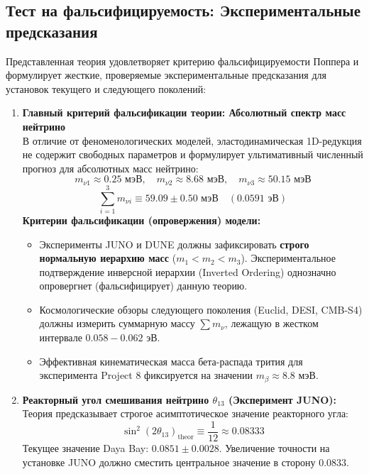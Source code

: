 \documentclass[12pt,a4paper]{article}
\begin{document}
\subsection{Тест на фальсифицируемость: Экспериментальные предсказания}
Представленная теория удовлетворяет критерию фальсифицируемости Поппера и формулирует жесткие, проверяемые экспериментальные предсказания для установок текущего и следующего поколений:

\begin{enumerate}
	\item \textbf{Главный критерий фальсификации теории: Абсолютный спектр масс нейтрино} \\
	В отличие от феноменологических моделей, эластодинамическая 1D-редукция не содержит свободных параметров и формулирует ультимативный численный прогноз для абсолютных масс нейтрино:
	\begin{equation}
		m_{\nu 1} \approx \mathbf{0.25 \text{ мэВ}}, \quad m_{\nu 2} \approx \mathbf{8.68 \text{ мэВ}}, \quad m_{\nu 3} \approx \mathbf{50.15 \text{ мэВ}}
	\end{equation}
	\begin{equation}
		\sum_{i=1}^3 m_{\nu i} \equiv \mathbf{59.09 \pm 0.50 \text{ мэВ}} \quad (0.0591 \text{ эВ})
	\end{equation}
	\textbf{Критерии фальсификации (опровержения) модели:}
	\begin{itemize}
		\item Эксперименты JUNO и DUNE должны зафиксировать \textbf{строго нормальную иерархию масс} ($m_1 < m_2 < m_3$). Экспериментальное подтверждение инверсной иерархии (Inverted Ordering) однозначно опровергнет (фальсифицирует) данную теорию.
		\item Космологические обзоры следующего поколения (Euclid, DESI, CMB-S4) должны измерить суммарную массу $\sum m_\nu$, лежащую в жестком интервале $0.058 - 0.062$ эВ.
		\item Эффективная кинематическая масса бета-распада трития для эксперимента Project 8 фиксируется на значении $m_\beta \approx \mathbf{8.8 \text{ мэВ}}$.
	\end{itemize}
	\item \textbf{Реакторный угол смешивания нейтрино $\theta_{13}$ (Эксперимент JUNO):}
	Теория предсказывает строгое асимптотическое значение реакторного угла:
	\begin{equation}
		\sin^2(2\theta_{13})_{\text{theor}} \equiv \frac{1}{12} \approx \mathbf{0.08333}
	\end{equation}
	Текущее значение Daya Bay: $0.0851 \pm 0.0028$. Увеличение точности на установке JUNO должно сместить центральное значение в сторону $0.0833$.
	

\end{enumerate}
\end{document}
